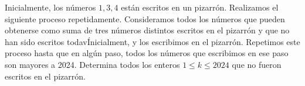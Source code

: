 \begin{problem}
    [ORO 2024/1]
    Inicialmente, los n\'umeros $1,3,4$ est\'an escritos en un pizarr\'on. Realizamos el siguiente proceso repetidamente.
    Consideramos todos los n\'umeros que pueden obtenerse como  suma de tres n\'umeros distintos escritos en el pizarr\'on y que no han sido escritos todav\'Inicialment,
    y los escribimos en el pizarr\'on. Repetimos este proceso hasta que en alg\'un paso, todos los n\'umeros que escribimos en ese paso son mayores a 2024.
    Determina todos los enteros $1\leq k\leq 2024$ que no fueron escritos en el pizarr\'on.
    \label{24ORO1}
\end{problem}
